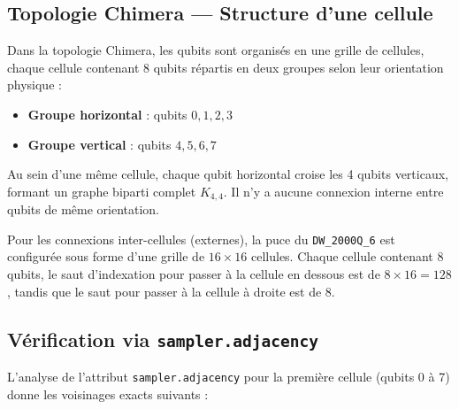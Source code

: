 \documentclass{ceri/sty/rapport}
\begin{document}
\begin{solution}

\subsection*{Topologie Chimera — Structure d'une cellule}

Dans la topologie Chimera, les qubits sont organisés en une grille de cellules, chaque cellule contenant 8 qubits répartis en deux groupes selon leur orientation physique :
\begin{itemize}
  \item \textbf{Groupe horizontal} : qubits $0, 1, 2, 3$
  \item \textbf{Groupe vertical} : qubits $4, 5, 6, 7$
\end{itemize}
Au sein d'une même cellule, chaque qubit horizontal croise les 4 qubits verticaux, formant un graphe biparti complet $K_{4,4}$. Il n'y a aucune connexion interne entre qubits de même orientation.

Pour les connexions inter-cellules (externes), la puce du \texttt{DW\_2000Q\_6} est configurée sous forme d'une grille de $16 \times 16$ cellules. Chaque cellule contenant 8 qubits, le saut d'indexation pour passer à la cellule en dessous est de $8 \times 16 = 128$, tandis que le saut pour passer à la cellule à droite est de $8$.

\subsection*{Vérification via \texttt{sampler.adjacency}}

L'analyse de l'attribut \texttt{sampler.adjacency} pour la première cellule (qubits 0 à 7) donne les voisinages exacts suivants :


\end{solution}
\end{document}
